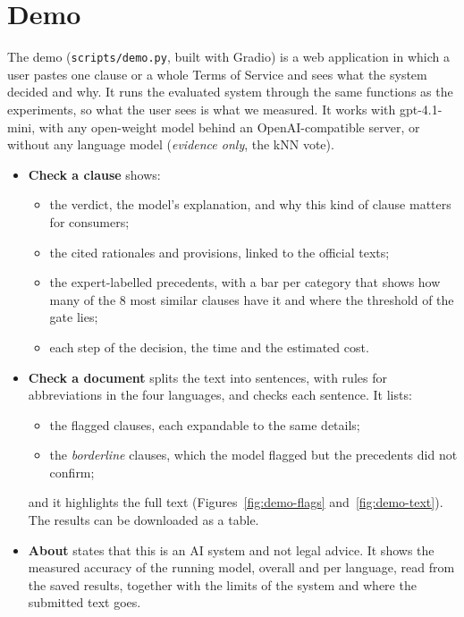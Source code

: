 \section{Demo}
\label{sec:demo}

The demo (\texttt{scripts/demo.py}, built with Gradio) is a web application in which a user pastes one clause or a whole Terms of Service and sees what the system decided and why. It runs the evaluated system through the same functions as the experiments, so what the user sees is what we measured. It works with gpt-4.1-mini, with any open-weight model behind an OpenAI-compatible server, or without any language model (\emph{evidence only}, the kNN vote).

\begin{itemize}
  \item \textbf{Check a clause} shows:
    \begin{itemize}
      \item the verdict, the model's explanation, and why this kind of clause matters for consumers;
      \item the cited rationales and provisions, linked to the official texts;
      \item the expert-labelled precedents, with a bar per category that shows how many of the 8 most similar clauses have it and where the threshold of the gate lies;
      \item each step of the decision, the time and the estimated cost.
    \end{itemize}
  \item \textbf{Check a document} splits the text into sentences, with rules for abbreviations in the four languages, and checks each sentence. It lists:
    \begin{itemize}
      \item the flagged clauses, each expandable to the same details;
      \item the \emph{borderline} clauses, which the model flagged but the precedents did not confirm;
    \end{itemize}
    and it highlights the full text (Figures~\ref{fig:demo-flags} and~\ref{fig:demo-text}). The results can be downloaded as a table.
  \item \textbf{About} states that this is an AI system and not legal advice. It shows the measured accuracy of the running model, overall and per language, read from the saved results, together with the limits of the system and where the submitted text goes.
\end{itemize}


